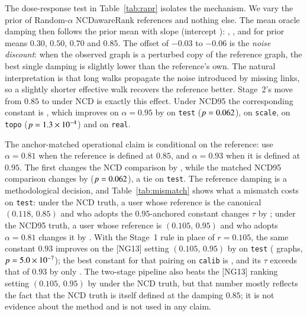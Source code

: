 \documentclass[11pt,a4paper]{article}
\theoremstyle{definition}
\theoremstyle{remark}
\begin{document}


The dose-response test in Table~\ref{tab:rapr} isolates the mechanism. We vary the prior of
Random-$\alpha$ NCDawareRank references and nothing else. The mean oracle damping then follows the prior
mean with slope \RaprSlope{} (intercept \RaprIcpt): \RaprLo, \RaprMid, \RaprHi{} and \RaprTop{} for
prior means $0.30$, $0.50$, $0.70$ and $0.85$. The offset of $-0.03$ to $-0.06$ is the \emph{noise
discount}: when the observed graph is a perturbed copy of the reference graph, the best single damping
is slightly lower than the reference's own. The natural interpretation is that long walks propagate the
noise introduced by missing links, so a slightly shorter effective walk recovers the reference better.
Stage~2's move from $0.85$
to \STwoConstAlpha{} under NCD is exactly this effect. Under NCD95 the corresponding constant is
\NfConstAlpha, which improves on $\alpha=0.95$ by \NfTestD{} on \texttt{test} ($p=0.062$),
\NfScaleD{} on \texttt{scale}, \NfTopoD{} on \texttt{topo} ($p=1.3\times10^{-4}$) and \NfRealD{} on
\texttt{real}.



The anchor-matched operational claim is conditional on the reference: use $\alpha=0.81$ when the
reference is defined at $0.85$, and $\alpha=0.93$ when it is defined at $0.95$. The first changes
the NCD comparison by \WpZeroNcdVsCanonical{}, while the matched NCD95 comparison changes by
\WpZeroNfMatched{} ($p=0.062$), a tie on \texttt{test}. The reference damping is a
methodological decision, and Table~\ref{tab:mismatch} shows what a mismatch costs on \texttt{test}: under
the NCD truth, a user whose reference is the canonical $(0.118,\,0.85)$ and who adopts the $0.95$-anchored
constant changes $\tau$ by \MisNcdNgHiCan{}; under the NCD95 truth, a user whose reference is
$(0.105,\,0.95)$ and who adopts $\alpha=0.81$ changes it by \MisNcdnfRuleLoNg{}.
With the Stage~1 rule in place of $r=0.105$, the same constant $0.93$ improves on the [NG13] setting
$(0.105,\,0.95)$ by \MisNcdnfRuleHiNg{} on \texttt{test} (\MisNcdnfRuleHiNgWins{} graphs, $p=5.0\times10^{-7}$);
the best constant for that pairing on \texttt{calib} is \MisRuleBestCalib{}, and its $\tau$ exceeds
that of $0.93$ by only \MisRuleBestCalibGap{}. The two-stage pipeline also beats the [NG13] ranking setting $(0.105,\,0.95)$ by \WpZeroNcdVsNg{}
under the NCD truth, but that number mostly reflects the fact that the NCD truth is itself defined at
the damping $0.85$; it is not evidence about the method and is not used in any claim.
\end{document}
